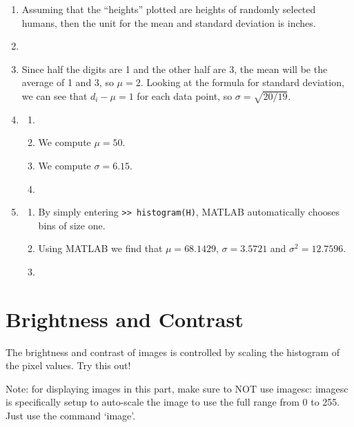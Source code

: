 \begin{sol}
\begin{enumerate}
    \item Assuming that the ``heights'' plotted are heights of randomly selected humans, then the unit for the mean and standard deviation is inches.
    \item 
    \item Since half the digits are 1 and the other half are 3, the mean will be the average of 1 and 3, so $\mu=2$. Looking at the formula for standard deviation, we can see that $d_i-\mu = 1$ for each data point, so $\sigma = \sqrt{20/19}$.
    \item \begin{enumerate}
        \item 
        \item We compute $\mu=50$.
        \item We compute $\sigma=6.15$.
        \item 
    \end{enumerate}
    \item 
    \begin{enumerate}
        \item By simply entering \texttt{>> histogram(H)}, MATLAB automatically chooses bins of size one.
    \item Using MATLAB we find that $\mu = 68.1429$, $\sigma = 3.5721$ and $\sigma^2 = 12.7596$.
    \item 
    \end{enumerate}
\end{enumerate}
\end{sol}


\section{Brightness and Contrast}
The brightness and contrast of images is controlled by scaling the histogram of the pixel values.  Try this out!

Note:  for displaying images in this part, make sure to NOT use imagesc:  imagesc is specifically setup to auto-scale the image to use the full range from 0 to 255. Just use the command `image'.

